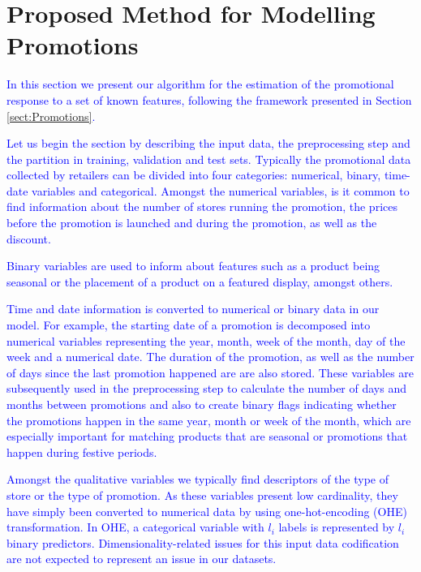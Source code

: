 \documentclass{ieeeaccess}
\newcommand{\myblue}[1]{\textcolor{blue}{#1}}
\begin{document}
\section{Proposed Method for Modelling Promotions} \label{sect:Model}

\myblue{In this section we present our algorithm for the estimation of the promotional response to a set of known features, following the framework presented in Section \ref{sect:Promotions}.}

\myblue{Let us begin the section by describing the input data, the preprocessing step and the partition in training, validation and test sets. Typically the promotional data collected by retailers can be divided into four categories: numerical, binary, time-date variables and categorical. Amongst the numerical variables, is it common to find information about the number of stores running the promotion, the prices before the promotion is launched and during the promotion, as well as the discount.}

\myblue{Binary variables are used to inform about features such as a product being seasonal or the placement of a product on a featured display, amongst others.}

\myblue{Time and date information is converted to numerical or binary data in our model. For example, the starting date of a  promotion is decomposed into numerical variables representing the year, month, week of the month, day of the week and a numerical date. The duration of the promotion, as well as the number of days since the last promotion happened are are also stored. These variables are subsequently used in the preprocessing step to calculate the number of days and months between promotions and also to create binary flags indicating whether the promotions happen in the same year, month or week of the month, which are especially important for matching products that are seasonal or promotions that happen during festive periods.}

\myblue{Amongst the qualitative variables we typically find descriptors of the type of store or the type of promotion. As these variables present low cardinality, they have simply been converted to numerical data by using one-hot-encoding (OHE) transformation. In OHE, a categorical variable with $l_i$ labels is represented by $l_i$ binary predictors. Dimensionality-related issues for this input data codification are not expected to represent an issue in our datasets.}
\end{document}
